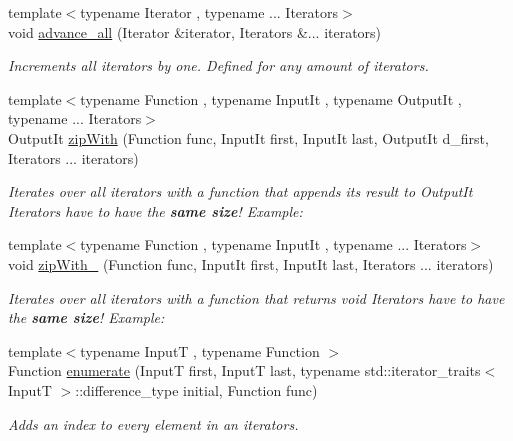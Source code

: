 \begin{DoxyCompactItemize}
{\footnotesize template$<$typename Iterator , typename ... Iterators$>$ }\\void \hyperlink{namespaceclara_1_1util_a2a91effd68bdcd381158dc56616849b3}{advance\+\_\+all} (Iterator \&iterator, Iterators \&... iterators)
\begin{DoxyCompactList}\small\item\em Increments all iterators by one. Defined for any amount of iterators. \end{DoxyCompactList}\item 
{\footnotesize template$<$typename Function , typename Input\+It , typename Output\+It , typename ... Iterators$>$ }\\Output\+It \hyperlink{namespaceclara_1_1util_a0c2e7a0cd942934cacd30db84c8095cc}{zip\+With} (Function func, Input\+It first, Input\+It last, Output\+It d\+\_\+first, Iterators ... iterators)
\begin{DoxyCompactList}\small\item\em Iterates over all iterators with a function that appends its result to Output\+It Iterators have to have the {\bfseries same size}! Example\+: \end{DoxyCompactList}\item 
{\footnotesize template$<$typename Function , typename Input\+It , typename ... Iterators$>$ }\\void \hyperlink{namespaceclara_1_1util_aeb41a8f553acc4a836cabbcad96e1007}{zip\+With\+\_\+} (Function func, Input\+It first, Input\+It last, Iterators ... iterators)
\begin{DoxyCompactList}\small\item\em Iterates over all iterators with a function that returns void Iterators have to have the {\bfseries same size}! Example\+: \end{DoxyCompactList}\item 
{\footnotesize template$<$typename InputT , typename Function $>$ }\\Function \hyperlink{namespaceclara_1_1util_ab84781d3b94b3ed04f195eab5bb3d02c}{enumerate} (InputT first, InputT last, typename std\+::iterator\+\_\+traits$<$ InputT $>$\+::difference\+\_\+type initial, Function func)
\begin{DoxyCompactList}\small\item\em Adds an index to every element in an iterators. \end{DoxyCompactList}\item 
\mbox{\label{namespaceclara_1_1util_a6e0e5139ee6278da7f25b7ea8dd365c1}} 

\end{DoxyCompactItemize}
